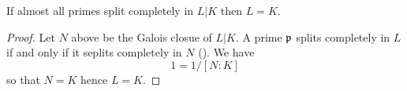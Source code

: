 \begin{corollary}
  If almost all primes split completely in $L|K$ then $L = K$.
\end{corollary}
\begin{proof}
  Let $N$ above be the Galois closue of $L|K$.
  A prime $\mathfrak{p}$ splits completely in $L$ if and only if it seplits completely in $N$ ().
  We have
  \[ 1 = 1/[N:K] \]
  so that $N = K$ hence $L = K$.
\end{proof}

